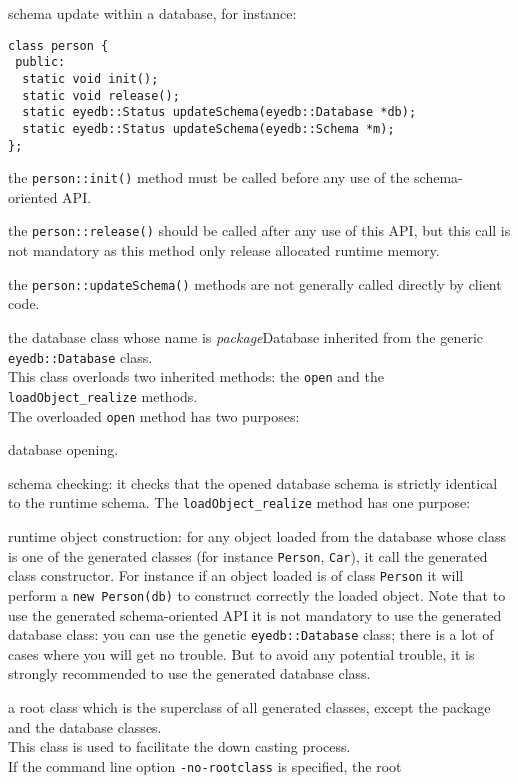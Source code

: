 schema update within a database, for instance:
\verbsize
\begin{verbatim}
class person {
 public:
  static void init();
  static void release();
  static eyedb::Status updateSchema(eyedb::Database *db);
  static eyedb::Status updateSchema(eyedb::Schema *m);
};
\end{verbatim}
\normalsize
\be
\item the \texttt{person::init()} method must be called before any use of
the schema-oriented API.
\item the \texttt{person::release()} should be called after any use
of this API, but this call is not mandatory as this method only
release allocated runtime memory.
\item the \texttt{person::updateSchema()} methods are not generally called
directly by client code.
\ee
\item the database class whose name is \emph{package}Database inherited
from the generic \texttt{eyedb::Database} class.
\\
This class overloads two inherited methods: the \texttt{open} and the
\texttt{loadObject\_realize} methods.
\\
The overloaded \texttt{open} method has two purposes:
\bi
\item database opening.
\item schema checking: it checks that the opened database schema is strictly
identical to the runtime schema.
\ei
The \texttt{loadObject\_realize} method has one purpose:
\bi
\item runtime object construction: for any object loaded from the database
whose class is one of the generated classes
(for instance \texttt{Person}, \texttt{Car}), it call the generated
class constructor. For instance if an object loaded is of class \texttt{Person}
it will perform a \texttt{new Person(db)} to construct correctly
the loaded object.
\ei
Note that to use the generated schema-oriented API it is not mandatory
to use the generated database class: you can use the genetic \texttt{eyedb::Database}
class; there is a lot of cases where you will get no trouble.
But to avoid any potential trouble, it is strongly recommended to use the
generated database class.
\item a root class which is the superclass of
all generated classes, except the package and the database classes.
\\
This class is used to facilitate the down casting process.
\\
If the command line option \texttt{-no-rootclass} is specified, the root
